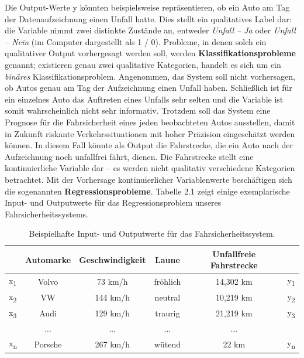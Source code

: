Die Output-Werte y könnten beispielsweise repräsentieren, ob ein
Auto am Tag der Datenaufzeichnung einen Unfall hatte. Dies stellt ein qualitatives
Label dar: die Variable nimmt zwei distinkte Zustände an, entweder \emph{Unfall --
  Ja} oder \emph{Unfall -- Nein} (im Computer dargestellt als 1 / 0). Probleme, in
denen solch ein qualitativer Output vorhergesagt werden soll, werden
\textbf{Klassifikationsprobleme} genannt; existieren genau zwei qualitative
Kategorien, handelt es sich um ein \emph{binäres} Klassifikationsproblem. Angenommen,
das System soll nicht vorhersagen, ob Autos genau am Tag der Aufzeichnung einen
Unfall haben. Schließlich ist für ein einzelnes Auto das Auftreten eines Unfalls sehr
selten und die Variable ist somit wahrscheinlich nicht sehr informativ. Trotzdem soll
das System eine Prognose für die Fahrsicherheit eines jeden beobachteten Autos
ausstellen, damit in Zukunft riskante Verkehrssituationen mit hoher Präzision
eingeschätzt werden können. In diesem Fall könnte als Output die Fahrstrecke, die ein
Auto nach der Aufzeichnung noch unfallfrei fährt, dienen. Die Fahrstrecke stellt eine
kontinuierliche Variable dar -- es werden nicht qualitativ verschiedene Kategorien
betrachtet. Mit der Vorhersage kontinuierlicher Variablenwerte beschäftigen sich die
sogenannten \textbf{Regressionsprobleme}. Tabelle 2.1 zeigt einige exemplarische
Input- und Outputwerte für das Regressionsproblem unseres Fahrsicherheitssystems.

\begin{table}[h!]
  \centering
  \caption{Beispielhafte Input- und Outputwerte für das Fahrsicherheitssystem.}

\vspace{0.3cm}

  \label{tab:svm_table1}
  \def\arraystretch{1.5}%
  \begin{tabular}{l|c|c|c||c|c}
    & Automarke & Geschwindigkeit & Laune & Unfallfreie Fahrstrecke &\\
    \hline
    x\textsubscript{1} & Volvo & 73 km/h & fröhlich & 14,302 km & y\textsubscript{1}\\
    \hline
    x\textsubscript{2} & VW & 144 km/h & neutral & 10,219 km & y\textsubscript{2}\\
    \hline
    x\textsubscript{3} & Audi & 129 km/h & traurig & 21,219 km & y\textsubscript{3}\\
    \hline

    & ... & ... & ... & ... &\\
    \hline
    x\textsubscript{n} & Porsche & 267 km/h & wütend & 22 km & y\textsubscript{n} \\

  \end{tabular}
\end{table}

